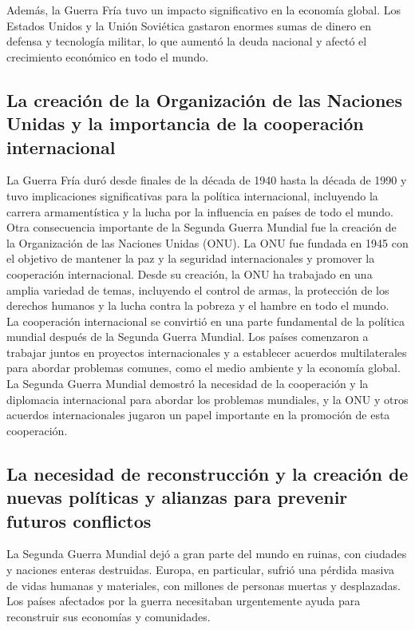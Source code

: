 \documentclass{article}
\theoremstyle{mytheoremstyle}
\theoremstyle{mytheoremstyle}
\theoremstyle{myproblemstyle}
\begin{document}
Además, la Guerra Fría tuvo un impacto significativo en la economía global. Los Estados Unidos y la Unión Soviética gastaron enormes sumas de dinero en defensa y tecnología militar, lo que aumentó la deuda nacional y afectó el crecimiento económico en todo el mundo.\\

\subsection{La creación de la Organización de las Naciones Unidas y la importancia de la cooperación internacional}

La Guerra Fría duró desde finales de la década de 1940 hasta la década de 1990 y tuvo implicaciones significativas para la política internacional, incluyendo la carrera armamentística y la lucha por la influencia en países de todo el mundo.\\

Otra consecuencia importante de la Segunda Guerra Mundial fue la creación de la Organización de las Naciones Unidas (ONU). La ONU fue fundada en 1945 con el objetivo de mantener la paz y la seguridad internacionales y promover la cooperación internacional. Desde su creación, la ONU ha trabajado en una amplia variedad de temas, incluyendo el control de armas, la protección de los derechos humanos y la lucha contra la pobreza y el hambre en todo el mundo.\\

La cooperación internacional se convirtió en una parte fundamental de la política mundial después de la Segunda Guerra Mundial. Los países comenzaron a trabajar juntos en proyectos internacionales y a establecer acuerdos multilaterales para abordar problemas comunes, como el medio ambiente y la economía global. La Segunda Guerra Mundial demostró la necesidad de la cooperación y la diplomacia internacional para abordar los problemas mundiales, y la ONU y otros acuerdos internacionales jugaron un papel importante en la promoción de esta cooperación.\\

\subsection{La necesidad de reconstrucción y la creación de nuevas políticas y alianzas para prevenir futuros conflictos}

La Segunda Guerra Mundial dejó a gran parte del mundo en ruinas, con ciudades y naciones enteras destruidas. Europa, en particular, sufrió una pérdida masiva de vidas humanas y materiales, con millones de personas muertas y desplazadas. Los países afectados por la guerra necesitaban urgentemente ayuda para reconstruir sus economías y comunidades.\\
\end{document}
